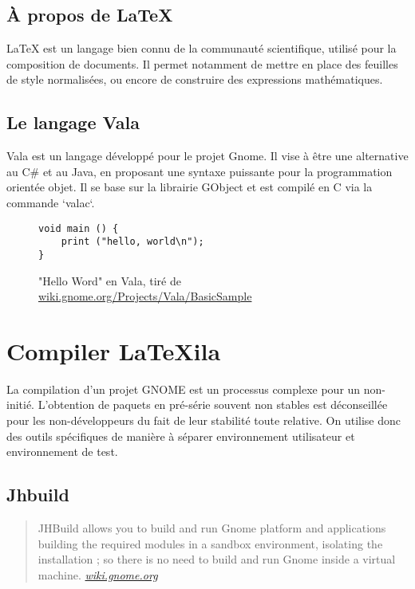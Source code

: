 \documentclass[a4paper,11pt]{report}
\begin{document}
%


\subsection{À propos de \LaTeX}
LaTeX est un langage bien connu de la communauté scientifique, utilisé pour la composition de documents.
Il permet notamment de mettre en place des feuilles de style normalisées, ou encore de construire des expressions mathématiques.

\subsection{Le langage Vala}
\label{sub:vala}
Vala est un langage développé pour le projet Gnome.
Il vise à être une alternative au C\# et au Java, en proposant une syntaxe puissante pour la programmation orientée objet.
Il se base sur la librairie GObject et est compilé en C via la commande `valac`.

\begin{figure}[h] %
\begin{lstlisting}
void main () {
    print ("hello, world\n");
}
\end{lstlisting}\caption{"Hello Word" en Vala, tiré de \url{wiki.gnome.org/Projects/Vala/BasicSample}}
\end{figure}

\section{Compiler LaTeXila}
\label{cha:compiler}
La compilation d'un projet GNOME est un processus complexe pour un non-initié.
L'obtention de paquets en pré-série souvent non stables est déconseillée pour les non-développeurs du fait de leur stabilité toute relative.
On utilise donc des outils spécifiques de manière à séparer environnement utilisateur et environnement de test. 

\subsection{Jhbuild}
\label{sub:jhbuild}

\begin{quote}
JHBuild allows you to build and run Gnome platform and applications building the required modules in a sandbox environment, isolating the installation ; so there is no need to build and run Gnome inside a virtual machine. \textit{\url{wiki.gnome.org}}
\end{quote}
\end{document}
